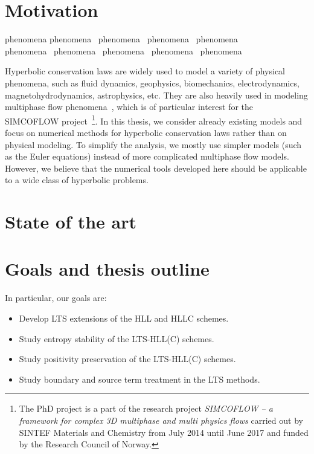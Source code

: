 \label{cha:Introduction}

\section{Motivation}

phenomena \cite{busch2018}
phenomena~\cite{busch2018a}
phenomena~\cite{busch2018b}
phenomena~\cite{busch2018c}
phenomena~\cite{busch2017}\\

phenomena~\cite{aarsnes2018}
phenomena~\cite{khatibi2017}
phenomena~\cite{busch2017a}
phenomena~\cite{busch2016}
phenomena~\cite{zoric2015}\\


Hyperbolic conservation laws are widely used to model a variety of physical phenomena, such as fluid dynamics, geophysics, biomechanics, electrodynamics, magnetohydrodynamics, astrophysics, etc. They are also heavily used in modeling multiphase flow phenomena~\cite{doraiswamy2002}, which is of particular interest for the SIMCOFLOW project~\cite{wallis1969}\footnote{The PhD project is a part of the research project \textit{SIMCOFLOW -- a framework for complex 3D multiphase and multi physics flows} carried out by SINTEF Materials and Chemistry from July 2014 until June 2017 and funded by the Research Council of Norway.}. In this thesis, we consider already existing models and focus on numerical methods for hyperbolic conservation laws rather than on physical modeling. To simplify the analysis, we mostly use simpler models (such as the Euler equations) instead of more complicated multiphase flow models. However, we believe that the numerical tools developed here should be applicable to a wide class of hyperbolic problems.

\section{State of the art}
\label{sec:history}


\section{Goals and thesis outline}
\label{cha1:sec:goals}

 In particular, our goals are:
\begin{itemize}
\item Develop LTS extensions of the HLL and HLLC schemes.
\item Study entropy stability of the LTS-HLL(C) schemes.
\item Study positivity preservation of the LTS-HLL(C) schemes.
\item Study boundary and source term treatment in the LTS methods.
\end{itemize}

